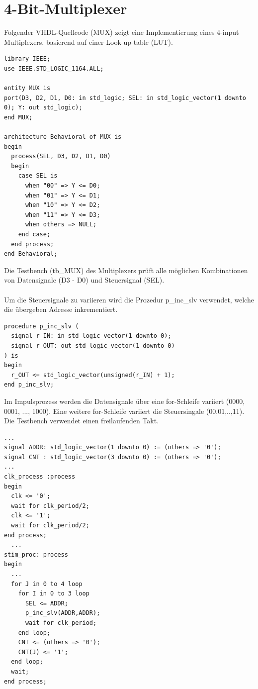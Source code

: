 \documentclass{article}
\newcommand{\enterProblemHeader}[1]{
}
\newcommand{\exitProblemHeader}[1]{
}
\newcounter{homeworkProblemCounter} %
\newcommand{\homeworkProblemName}{}
\newenvironment{homeworkProblem}[1][Problem \arabic{homeworkProblemCounter}]{ %
\stepcounter{homeworkProblemCounter} %
\renewcommand{\homeworkProblemName}{#1} %
\section{\homeworkProblemName} %
\enterProblemHeader{\homeworkProblemName} %
}{
\exitProblemHeader{\homeworkProblemName} %
}
\begin{document}


\begin{homeworkProblem}[4-Bit-Multiplexer]
Folgender VHDL-Quellcode (MUX) zeigt eine Implementierung eines 4-input Multiplexers, 
basierend auf einer Look-up-table (LUT).

\begin{verbatim}
library IEEE;
use IEEE.STD_LOGIC_1164.ALL;

entity MUX is
port(D3, D2, D1, D0: in std_logic; SEL: in std_logic_vector(1 downto 0); Y: out std_logic);
end MUX;

architecture Behavioral of MUX is
begin
  process(SEL, D3, D2, D1, D0)
  begin
    case SEL is
      when "00" => Y <= D0;
      when "01" => Y <= D1;
      when "10" => Y <= D2;
      when "11" => Y <= D3;
      when others => NULL;
    end case;
  end process;
end Behavioral;
\end{verbatim}
Die Testbench (tb\_MUX) des Multiplexers prüft alle möglichen Kombinationen von 
Datensignale (D3 - D0) und Steuersignal (SEL).
\\\\
Um die Steuersignale zu variieren wird die Prozedur p\_inc\_slv verwendet, welche 
die übergeben Adresse inkrementiert. 
\begin{verbatim}
procedure p_inc_slv (
  signal r_IN: in std_logic_vector(1 downto 0);
  signal r_OUT: out std_logic_vector(1 downto 0)
) is
begin
  r_OUT <= std_logic_vector(unsigned(r_IN) + 1);
end p_inc_slv;
\end{verbatim}
Im Impulsprozess werden die Datensignale über eine for-Schleife variiert (0000, 0001,
..., 1000). Eine weitere for-Schleife variiert die Steuersingale (00,01,..,11). Die 
Testbench verwendet einen freilaufenden Takt.
\begin{verbatim}
...
signal ADDR: std_logic_vector(1 downto 0) := (others => '0');
signal CNT : std_logic_vector(3 downto 0) := (others => '0');
...
clk_process :process
begin
  clk <= '0';
  wait for clk_period/2;
  clk <= '1';
  wait for clk_period/2;
end process;
  ...
stim_proc: process
begin		
  ...
  for J in 0 to 4 loop
    for I in 0 to 3 loop
      SEL <= ADDR;
      p_inc_slv(ADDR,ADDR);
      wait for clk_period;
    end loop;
    CNT <= (others => '0');
    CNT(J) <= '1';
  end loop;
  wait;
end process;
\end{verbatim}

\end{homeworkProblem}
\end{document}
